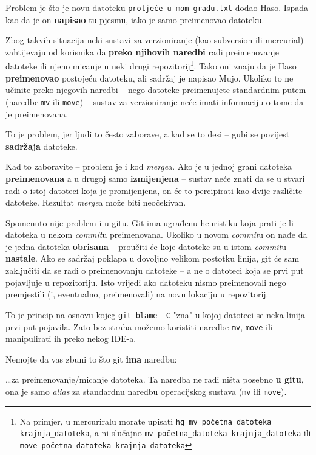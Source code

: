 Problem je što je novu datoteku \verb+proljeće-u-mom-gradu.txt+ dodao Haso.
Ispada kao da je on \textbf{napisao} tu pjesmu, iako je samo preimenovao datoteku.

Zbog takvih situacija neki sustavi za verzioniranje (kao subversion ili mercurial) zahtijevaju od korisnika da \textbf{preko njihovih naredbi} radi preimenovanje datoteke ili njeno micanje u neki drugi repozitorij\footnote{Na primjer, u mercuriralu morate upisati \texttt{hg mv početna\_datoteka krajnja\_datoteka}, a ni slučajno \texttt{mv početna\_datoteka krajnja\_datoteka} ili \texttt{move početna\_datoteka krajnja\_datoteka}}.
Tako oni znaju da je Haso \textbf{preimenovao} postojeću datoteku, ali sadržaj je napisao Mujo.
Ukoliko to ne učinite preko njegovih naredbi -- nego datoteke preimenujete standardnim putem (naredbe \verb+mv+ ili \verb+move+) -- sustav za verzioniranje neće imati informaciju o tome da je preimenovana. 

To je problem, jer ljudi to često zaborave, a kad se to desi -- gubi se povijest \textbf{sadržaja} datoteke.

Kad to zaboravite -- problem je i kod \emph{merge}a.
Ako je u jednoj grani datoteka \textbf{preimenovana} a u drugoj samo \textbf{izmijenjena} -- sustav neće znati da se u stvari radi o istoj datoteci koja je promijenjena, on će to percipirati kao dvije različite datoteke.
Rezultat \emph{merge}a može biti neočekivan.

Spomenuto nije problem i u gitu.
Git ima ugrađenu heuristiku koja prati je li datoteka u nekom \emph{commit}u preimenovana.
Ukoliko u novom \emph{commit}u on nađe da je jedna datoteka \textbf{obrisana} -- proučiti će koje datoteke su u istom \emph{commit}u \textbf{nastale}. 
Ako se sadržaj poklapa u dovoljno velikom postotku linija, git će sam zaključiti da se radi o preimenovanju datoteke -- a ne o datoteci koja se prvi put pojavljuje u repozitoriju.
Isto vrijedi ako datoteku nismo preimenovali nego premjestili (i, eventualno, preimenovali) na novu lokaciju u repozitorij.

To je princip na osnovu kojeg \verb+git blame -C+ "zna" u kojoj datoteci se neka linija prvi put pojavila.
Zato bez straha možemo koristiti naredbe \verb+mv+, \verb+move+ ili manipulirati ih preko nekog IDE-a.

Nemojte da vas zbuni to što git \textbf{ima} naredbu:


\dots{}za preimenovanje/micanje datoteka.
Ta naredba ne radi ništa posebno \textbf{u gitu}, ona je samo \emph{alias} za standardnu naredbu operacijskog sustava (\verb+mv+ ili \verb+move+).

